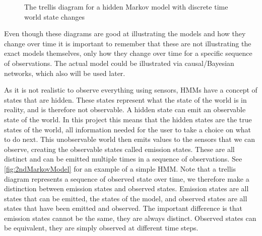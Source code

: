 \begin{figure}[htbp]
\centering
{}
\caption[Trellis diagram for a simple Markov model]{The trellis diagram for a hidden Markov model with discrete time world state changes}\label{fig:1stMarkovModel}
\end{figure}

Even though these diagrams are good at illustrating the models and how they change over time it is important to remember that these are not illustrating the exact models themselves, only how they change over time for a specific sequence of observations. The actual model could be illustrated via causal/Bayesian networks, which also will be used later.


As it is not realistic to observe everything using sensors, HMMs have a concept of states that are hidden. These states represent what the state of the world is in reality, and is therefore not observable. A hidden state can emit an observable state of the world. In this project this means that the hidden states are the true states of the world, all information needed for the user to take a choice on what to do next. This unobservable world then emits values to the sensors that we can observe, creating the observable states called emission states. These are all distinct and can be emitted multiple times in a sequence of observations. See \cref{fig:2ndMarkovModel} for an example of a simple HMM. Note that a trellis diagram represents a sequence of observed state over time, we therefore make a distinction between emission states and observed states. Emission states are all states that can be emitted, the states of the model, and observed states are all states that have been emitted and observed. The important difference is that emission states cannot be the same, they are always distinct. Observed states can be equivalent, they are simply observed at different time steps. 


